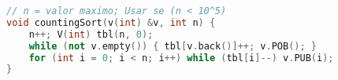 \begin{lstlisting}[language=C++, title={Use sempre que possível}]
// n = valor maximo; Usar se (n < 10^5)
void countingSort(v(int) &v, int n) {
    n++; V(int) tbl(n, 0);
    while (not v.empty()) { tbl[v.back()]++; v.POB(); }
	for (int i = 0; i < n; i++) while (tbl[i]--) v.PUB(i);
}
\end{lstlisting}
